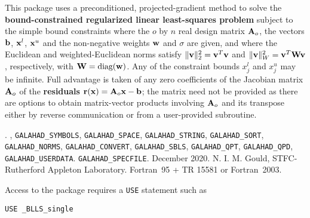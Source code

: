 \documentclass{galahad}
\newcommand{\packagename}{BLLS}
\newcommand{\fullpackagename}{\libraryname\_\packagename}
\begin{document}
\galheader


\galsummary
This package uses a preconditioned, projected-gradient method
to solve the {\bf bound-constrained regularized linear least-squares problem}
subject to the simple bound constraints
where the $o$ by $n$ real design matrix ${\mathbf{A}}_o$, the vectors 
${\mathbf{b}}$, ${\mathbf{x}}^{l}$, ${\mathbf{x}}^{u}$ and the non-negative weights ${\mathbf{w}}$ and 
$\sigma$ are given, and where the Euclidean and weighted-Euclidean norms
satisfy $\|{\mathbf{v}}\|_2^2 = {\mathbf{v}}^T {\mathbf{v}}$ and $\|{\mathbf{v}}\|_W^2 = {\mathbf{v}}^T {\mathbf{W}} {\mathbf{v}}$,
respectively, with ${\mathbf{W}} = \mbox{diag}({\mathbf{w}})$.
Any of the constraint bounds $x_{j}^{l}$ and $x_{j}^{u}$ may be infinite.
Full advantage is taken of any zero coefficients of the Jacobian matrix 
${\mathbf{A}}_o$ of the {\bf residuals} ${\mathbf{r}}({\mathbf{x}}) = {\mathbf{A}}_o {\mathbf{x}} - {\mathbf{b}}$;
the matrix need not be provided as there are options to obtain matrix-vector
products involving ${\mathbf{A}}_o$ and its transpose either by reverse communication
or from a user-provided subroutine.


\galattributes
\galversions{\tt  \fullpackagename\_single, \fullpackagename\_double}.
,
{\tt GALAHAD\-\_SY\-M\-BOLS},
{\tt GALAHAD\-\_\-SPACE},
{\tt GALAHAD\_STRING},
{\tt GALAHAD\_SORT},
{\tt GALAHAD\_NORMS},
{\tt GALAHAD\_CONVERT},
{\tt GALAHAD\_SBLS},
{\tt GALAHAD\_QPT},
{\tt GALAHAD\_QPD},
{\tt GALAHAD\_USERDATA}.
{\tt GALAHAD\_SPECFILE}.
\galdate December 2020.
\galorigin N. I. M. Gould, STFC-Rutherford Appleton Laboratory.
\gallanguage Fortran~95 + TR 15581 or Fortran~2003.


\galhowto


Access to the package requires a {\tt USE} statement such as

\medskip{}

\hspace{8mm} {\tt USE \fullpackagename\_single}
\end{document}
